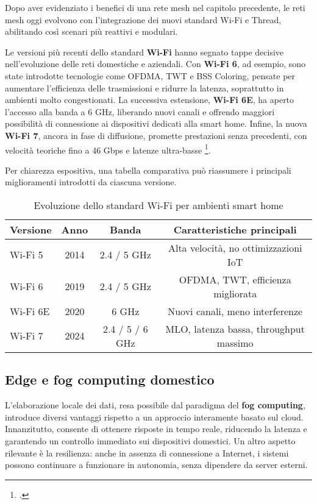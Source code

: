 Dopo aver evidenziato i benefici di una rete mesh nel capitolo precedente, le reti mesh oggi evolvono con l’integrazione dei nuovi standard Wi-Fi e Thread, abilitando così scenari più reattivi e modulari.


Le versioni più recenti dello standard \textbf{Wi-Fi} hanno segnato tappe decisive nell’evoluzione delle reti domestiche e aziendali. Con \textbf{Wi-Fi 6}, ad esempio, sono state introdotte tecnologie come OFDMA, TWT e BSS Coloring, pensate per aumentare l’efficienza delle trasmissioni e ridurre la latenza, soprattutto in ambienti molto congestionati. La successiva estensione, \textbf{Wi-Fi 6E}, ha aperto l’accesso alla banda a 6 GHz, liberando nuovi canali e offrendo maggiori possibilità di connessione ai dispositivi dedicati alla smart home. Infine, la nuova \textbf{Wi-Fi 7}, ancora in fase di diffusione, promette prestazioni senza precedenti, con velocità teoriche fino a 46 Gbps e latenze ultra-basse \footcite{wifi6-spec}.  

Per chiarezza espositiva, una tabella comparativa può riassumere i principali miglioramenti introdotti da ciascuna versione.


\begin{table}[H]
\centering
\begin{tabular}{lccc}
\toprule
\textbf{Versione} & \textbf{Anno} & \textbf{Banda} & \textbf{Caratteristiche principali} \\
\midrule
Wi-Fi 5 & 2014 & 2.4 / 5 GHz & Alta velocità, no ottimizzazioni IoT \\
Wi-Fi 6 & 2019 & 2.4 / 5 GHz & OFDMA, TWT, efficienza migliorata \\
Wi-Fi 6E & 2020 & 6 GHz & Nuovi canali, meno interferenze \\
Wi-Fi 7 & 2024 & 2.4 / 5 / 6 GHz & MLO, latenza bassa, throughput massimo \\
\bottomrule
\end{tabular}
\caption{Evoluzione dello standard Wi-Fi per ambienti smart home}
\end{table}

\subsection{Edge e fog computing domestico}

L’elaborazione locale dei dati, resa possibile dal paradigma del \textbf{fog computing}, introduce diversi vantaggi rispetto a un approccio interamente basato sul cloud. Innanzitutto, consente di ottenere risposte in tempo reale, riducendo la latenza e garantendo un controllo immediato sui dispositivi domestici. Un altro aspetto rilevante è la resilienza: anche in assenza di connessione a Internet, i sistemi possono continuare a funzionare in autonomia, senza dipendere da server esterni.  

